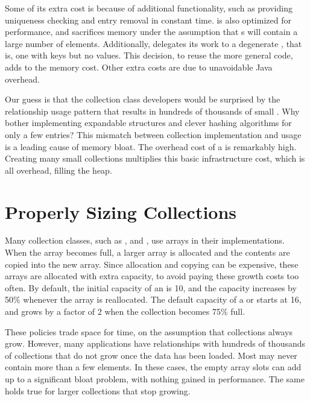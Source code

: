Some of its extra cost is because of additional functionality,
such as providing uniqueness checking and entry removal in constant time.
 is also optimized for performance, and sacrifices memory 
under the assumption that s will contain a large number of
elements. Additionally,  delegates its work to a
degenerate , that is, one with keys but no values. This decision,
to reuse the more general  code, adds to the memory
cost. Other extra costs are due to unavoidable Java overhead.

Our guess is that the
collection class developers would be surprised by the relationship usage pattern
that results in hundreds of thousands of small . Why bother
implementing expandable structures and clever hashing algorithms for only a few entries?
This mismatch between collection implementation and usage is 
a leading cause of memory bloat. The overhead cost of a  is
remarkably high. Creating many small collections multiplies this basic infrastructure
cost, which is all overhead, filling the heap. 
 

\section{Properly Sizing Collections}
\label{sec:proper-size}

Many collection classes, such as ,  and
, use arrays in their implementations. When the array becomes
full, a larger array is allocated and the contents are copied into the new array.
Since allocation and copying can be expensive, these arrays are
allocated with extra capacity, to avoid paying these growth costs too
often. 
By default, the initial capacity of an  is 10, and the capacity
increases by 50\% whenever the array is reallocated.
The default capacity of a  or 
starts at 16, and grows by a factor of 2 when the collection becomes 75\% full.

These policies trade space
for time, on the assumption that collections always grow.
However, many applications have relationships with
hundreds of thousands of collections that do not grow once the data has
been loaded. Most may never contain more than a few elements. 
In these cases, the empty array slots can add up to a
significant bloat problem, with nothing gained in performance. 
The same holds true for larger collections that stop growing. 

